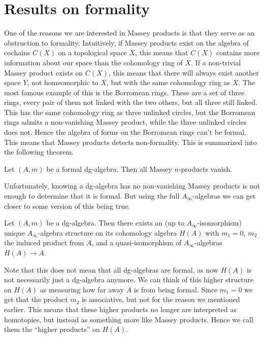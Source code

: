 

\section{Results on formality}

One of the reasons we are interested in Massey products is that they serve as an 
obstruction to formality. Intuitively, if Massey products exist on the algebra of 
cochains $C(X)$ on a topological space $X$, this means that $C(X)$ contains more 
information about our space than the cohomology ring of $X$. If a non-trivial Massey 
product exists on $C(X)$, this means that there will always exist another space $Y$, 
not homeomorphic to $X$, but with the same cohomology ring as $X$. The most famous 
example of this is the Borromean rings. These are a set of three rings, every pair of 
them not linked with the two others, but all three still linked. This has the same 
cohomology ring as three unlinked circles, but the Borromean rings admits a non-vanishing 
Massey product, while the three unlinked circles does not. Hence the algebra of forms 
on the Borromean rings can't be formal. This means that Massey products detects 
non-formality. This is summarized into the following theorem.

\begin{theorem}
    Let $(A, m)$ be a formal dg-algebra. Then all Massey $n$-products vanish.         
\end{theorem}

Unfortunately, knowing a dg-algebra has no non-vanishing Massey products is not enough 
to determine that it is formal. But using the full $A_\infty$-algebras we can get closer 
to some version of this being true.

\begin{theorem}
    Let $(A,m)$ be a dg-algebra. Then there exists an (up to $A_\infty$-isomorphism) 
    unique $A_\infty$-algebra structure on its cohomology algebra $H(A)$ with $m_1=0$, 
    $m_2$ the induced product from $A$, and a quasi-isomorphism of $A_\infty$-algebras 
    $H(A)\longrightarrow A$.
\end{theorem}

Note that this does not mean that all dg-algebras are formal, as now $H(A)$ is not 
necessarily just a dg-algebra anymore. We can think of this higher structure on $H(A)$ 
as measuring how far away $A$ is from being formal. Since $m_1=0$ we get that the 
product $m_2$ is associative, but not for the reason we mentioned earlier. This means 
that these higher products no longer are interpreted as homotopies, but instead as 
something more like Massey products. Hence we call them the ``higher products'' on $H(A)$.

